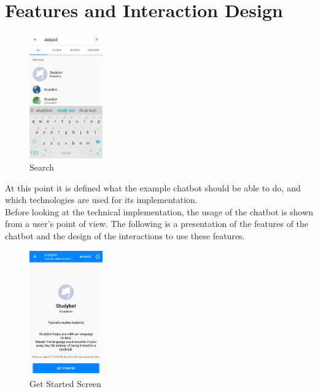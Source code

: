 \pagebreak
\section{Features and Interaction Design}
\label{implementation}


\begin{figure}
  \centering
  \includegraphics[width=0.28\textwidth]{images/interface/01-search.png}
	\caption{Search}
	\label{fig:01-search}
\end{figure}

At this point it is defined what the example chatbot should be able to do,
and which technologies are used for its implementation.
\\
Before looking at the technical implementation,
the usage of the chatbot is shown from a user's point of view.
The following is a presentation of the features of the chatbot
and the design of the interactions to use these features.
\\

\begin{figure}
  \centering
  \includegraphics[width=0.28\textwidth]{images/interface/02-getstarted.png}
	\caption{Get Started Screen}
	\label{fig:02-getstarted}
\end{figure}

